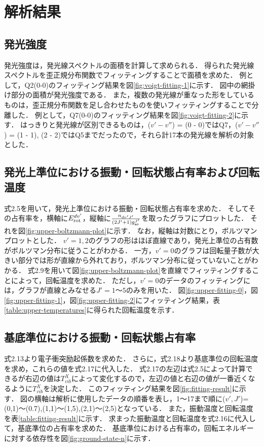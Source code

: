 \chapter{解析結果}

\section{発光強度}
発光強度は，発光線スペクトルの面積を計算して求められる．
得られた発光線スペクトルを歪正規分布関数でフィッティングすることで面積を求めた．
例として，Q2(0-0)のフィッティング結果を図\ref{fig:voigt-fitting-1}に示す．
図中の網掛け部分の面積が発光強度である．
また，複数の発光線が重なった形をしているものは，歪正規分布関数を足し合わせたものを使いフィッティングすることで分離した．
例として，Q7(0-0)のフィッティング結果を図\ref{fig:voigt-fitting-2}に示す．
はっきりと発光線が区別できるものは，($v'-v''$) = (0 - 0)ではQ7，($v'-v''$) = (1 - 1), (2 - 2)ではQ5までだったので，それら計17本の発光線を解析の対象とした．

\section{発光上準位における振動・回転状態占有率および回転温度}
式2.5を用いて，発光上準位における振動・回転状態占有率を求めた．
そしてその占有率を，横軸に$E^{dv'}_{\rm rot}$，縦軸に$\frac{n_{dv'J'}}{\left( 2J'+1 \right) g^{J'}_{\rm as}}$を取ったグラフにプロットした．
それを図\ref{fig:upper-boltzmann-plot}に示す．
なお，縦軸は対数にとり，ボルツマンプロットとした．
$v'=1,2$のグラフの形はほぼ直線であり，発光上準位の占有数がボルツマン分布に従うことがわかる．
一方，$v'=0$のグラフは回転量子数が大きい部分では形が直線から外れており，ボルツマン分布に従っていないことがわかる．
式2.9を用いて図\ref{fig:upper-boltzmann-plot}を直線でフィッティングすることによって，回転温度を求めた．
ただし，$v'=0$のデータのフィッティングには，グラフが直線とみなせる$J'=1〜5$のみを用いた．
図\ref{fig:upper-fitting-0}，図\ref{fig:upper-fitting-1}，図\ref{fig:upper-fitting-2}にフィッティング結果，表\ref{table:upper-temperatures}に得られた回転温度を示す．

\section{基底準位における振動・回転状態占有率}
式2.13より電子衝突励起係数を求めた．
さらに，式2.18より基底準位の回転温度を求め，これらの値を式2.17に代入した．
式2.17の左辺は式2.5によって計算できるが右辺の値は$T^X_{vib}$によって変化するので，左辺の値と右辺の値が一番近くなるように$T^X_{vib}$を決定した．
このフィッティング結果を図\ref{fig:fitting-result}に示す．
図の横軸は解析に使用したデータの順番を表し，1〜17まで順に($v',J'$)=(0,1)〜(0.7),(1,1)〜(1,5),(2,1)〜(2,5)となっている．
また，振動温度と回転温度を表\ref{table:fitting-result}に示す．
求まった振動温度と回転温度を式2.16に代入して，基底準位の占有率を求めた．
基底準位における占有率の，回転エネルギーに対する依存性を図\ref{fig:ground-state-n}に示す．